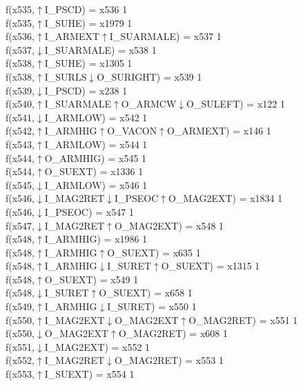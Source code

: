 f(x535,$\uparrow$I\_PSCD) = x536 {1} \\
f(x535,$\uparrow$I\_SUHE) = x1979 {1} \\
f(x536,$\uparrow$I\_ARMEXT$\uparrow$I\_SUARMALE) = x537 {1} \\
f(x537,$\downarrow$I\_SUARMALE) = x538 {1} \\
f(x538,$\uparrow$I\_SUHE) = x1305 {1} \\
f(x538,$\uparrow$I\_SURLS$\downarrow$O\_SURIGHT) = x539 {1} \\
f(x539,$\downarrow$I\_PSCD) = x238 {1} \\
f(x540,$\uparrow$I\_SUARMALE$\uparrow$O\_ARMCW$\downarrow$O\_SULEFT) = x122 {1} \\
f(x541,$\downarrow$I\_ARMLOW) = x542 {1} \\
f(x542,$\uparrow$I\_ARMHIG$\uparrow$O\_VACON$\uparrow$O\_ARMEXT) = x146 {1} \\
f(x543,$\uparrow$I\_ARMLOW) = x544 {1} \\
f(x544,$\uparrow$O\_ARMHIG) = x545 {1} \\
f(x544,$\uparrow$O\_SUEXT) = x1336 {1} \\
f(x545,$\downarrow$I\_ARMLOW) = x546 {1} \\
f(x546,$\downarrow$I\_MAG2RET$\downarrow$I\_PSEOC$\uparrow$O\_MAG2EXT) = x1834 {1} \\
f(x546,$\downarrow$I\_PSEOC) = x547 {1} \\
f(x547,$\downarrow$I\_MAG2RET$\uparrow$O\_MAG2EXT) = x548 {1} \\
f(x548,$\uparrow$I\_ARMHIG) = x1986 {1} \\
f(x548,$\uparrow$I\_ARMHIG$\uparrow$O\_SUEXT) = x635 {1} \\
f(x548,$\uparrow$I\_ARMHIG$\downarrow$I\_SURET$\uparrow$O\_SUEXT) = x1315 {1} \\
f(x548,$\uparrow$O\_SUEXT) = x549 {1} \\
f(x548,$\downarrow$I\_SURET$\uparrow$O\_SUEXT) = x658 {1} \\
f(x549,$\uparrow$I\_ARMHIG$\downarrow$I\_SURET) = x550 {1} \\
f(x550,$\uparrow$I\_MAG2EXT$\downarrow$O\_MAG2EXT$\uparrow$O\_MAG2RET) = x551 {1} \\
f(x550,$\downarrow$O\_MAG2EXT$\uparrow$O\_MAG2RET) = x608 {1} \\
f(x551,$\downarrow$I\_MAG2EXT) = x552 {1} \\
f(x552,$\uparrow$I\_MAG2RET$\downarrow$O\_MAG2RET) = x553 {1} \\
f(x553,$\uparrow$I\_SUEXT) = x554 {1} \\
